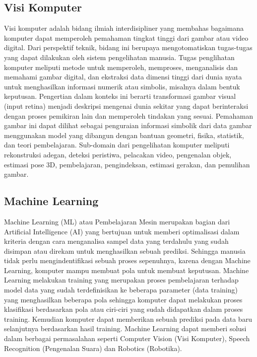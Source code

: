 \subsection{Visi Komputer}
Visi komputer adalah bidang ilmiah interdisipliner yang membahas bagaimana komputer dapat memperoleh 
pemahaman tingkat tinggi dari gambar atau video digital. Dari perspektif teknik, bidang ini berupaya 
mengotomatiskan tugas-tugas yang dapat dilakukan oleh sistem pengelihatan  manusia. Tugas  penglihatan 
komputer   meliputi metode untuk memperoleh, memproses, menganalisis dan memahami gambar digital, dan 
ekstraksi data dimensi tinggi dari dunia nyata untuk menghasilkan informasi numerik atau simbolis, 
misalnya dalam bentuk keputusan. Pengertian dalam konteks ini berarti transformasi gambar visual 
(input retina) menjadi deskripsi mengenai dunia sekitar yang dapat berinteraksi dengan proses pemikiran 
lain dan memperoleh tindakan yang sesuai. Pemahaman gambar ini dapat dilihat sebagai penguraian informasi 
simbolik dari data gambar menggunakan model yang dibangun dengan bantuan geometri, fisika, statistik, dan 
teori pembelajaran. Sub-domain dari pengelihatan komputer meliputi rekonstruksi adegan, deteksi peristiwa, 
pelacakan video, pengenalan objek, estimasi pose 3D, pembelajaran, pengindeksan, estimasi gerakan, dan 
pemulihan gambar\citep{MachineVisionMachineLearning}.

\subsection{Machine Learning}
Machine Learning (ML) atau Pembelajaran Mesin merupakan bagian dari Artificial Intelligence (AI) yang 
bertujuan untuk memberi optimalisasi dalam kriteria dengan cara menganalisa sampel data yang terdahulu 
yang sudah disimpan atau direkam untuk menghasilkan sebuah prediksi. Sehingga manusia tidak perlu 
mengindentifikasi sebuah proses sepenuhnya, karena dengan Machine Learning, komputer mampu membuat pola 
untuk membuat keputusan. Machine Learning melakukan training yang merupakan proses pembelajaran terhadap 
model data yang sudah terdefinisikan ke beberapa parameter (data training) yang menghasilkan beberapa 
pola sehingga komputer dapat melakukan proses klasifikasi berdasarkan pola atau ciri-ciri yang sudah 
didapatkan dalam proses training. Kemudian komputer dapat memberikan sebuah prediksi pada data baru 
selanjutnya berdasarkan hasil training. Machine Learning dapat memberi solusi dalam berbagai permasalahan
 seperti Computer Vision (Visi Komputer), Speech Recognition (Pengenalan Suara) dan Robotics (Robotika)\citep{MachineLearning}.


